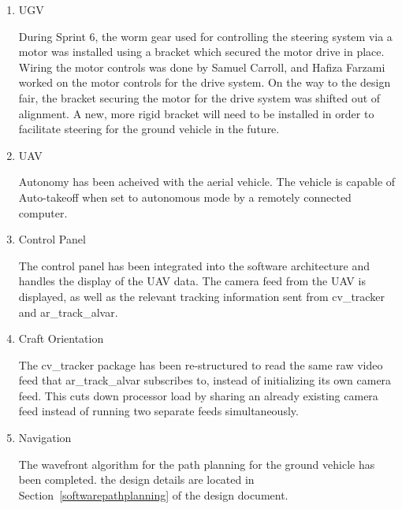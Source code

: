 \begin{enumerate}

\item UGV

During Sprint 6, the worm gear used for controlling the steering system via a motor was installed using a bracket which secured the motor drive in place. Wiring the motor controls was done by Samuel Carroll, and Hafiza Farzami worked on the motor controls for the drive system. On the way to the design fair, the bracket securing the motor for the drive system was shifted out of alignment. A new, more rigid bracket will need to be installed in order to facilitate steering for the ground vehicle in the future.

\item UAV 

Autonomy has been acheived with the aerial vehicle. The vehicle is capable of Auto-takeoff when set to autonomous mode by a remotely connected computer.

\item Control Panel

The control panel has been integrated into the software architecture and handles the display of the UAV data. The camera feed from the UAV is displayed, as well as the relevant tracking information sent from cv\_tracker and ar\_track\_alvar.

\item Craft Orientation

The cv\_tracker package has been re-structured to read the same raw video feed that ar\_track\_alvar subscribes to, instead of initializing its own camera feed. This cuts down processor load by sharing an already existing camera feed instead of running two separate feeds simultaneously.

\item Navigation

The wavefront algorithm for the path planning for the ground vehicle has been completed. the design details are located in Section~\ref{softwarepathplanning} of the design document.

\end{enumerate}